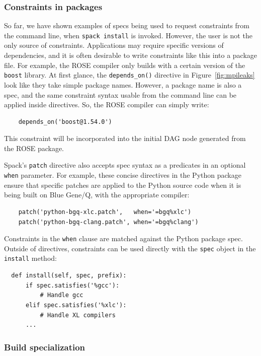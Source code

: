 \subsubsection{Constraints in packages}

So far, we have shown examples of specs being used to request constraints from the
command line, when {\tt spack install} is invoked.  However, the user is not the only
source of constraints.  Applications may require specific versions of dependencies,
and it is often desirable to write constraints like this into a package file.  For
example, the ROSE compiler only builds with a certain version of the {\tt boost} library.
At first glance, the {\tt depends\_on()} directive in Figure~\ref{fig:mpileaks} look
like they take simple package names.  However, a package name is also a spec, and
the same constraint syntax usable from the command line can be applied inside directives.
So, the ROSE compiler can simply write:
%
\begin{verbatim}
    depends_on('boost@1.54.0')
\end{verbatim}
%
This constraint will be incorporated into the initial DAG node generated from
the ROSE package.

Spack's {\tt patch} directive also accepts spec syntax as a predicates in an
optional {\tt when} parameter.  For example, these concise directives in the 
Python package ensure that specific patches are applied to the Python source
code when it is being built on Blue Gene/Q, with the appropriate compiler:
%
\begin{verbatim}
    patch('python-bgq-xlc.patch',   when='=bgq%xlc')
    patch('python-bgq-clang.patch', when='=bgq%clang')
\end{verbatim}
%
Constraints in the {\tt when} clause are matched against the Python package spec.
Outside of directives, constraints can be used directly
with the {\tt spec} object in the {\tt install} method:
%
\begin{verbatim}
  def install(self, spec, prefix):
      if spec.satisfies('%gcc'):
          # Handle gcc
      elif spec.satisfies('%xlc'):
          # Handle XL compilers
      ...
\end{verbatim}
%

\subsubsection{Build specialization}

